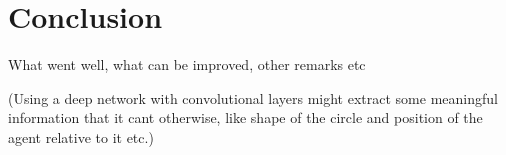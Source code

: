\section{Conclusion}\label{sec:conclusions}
What went well, what can be improved, other remarks etc

(Using a deep network with convolutional layers might extract some meaningful information that it cant otherwise, like shape of the circle and position of the agent relative to it etc.)